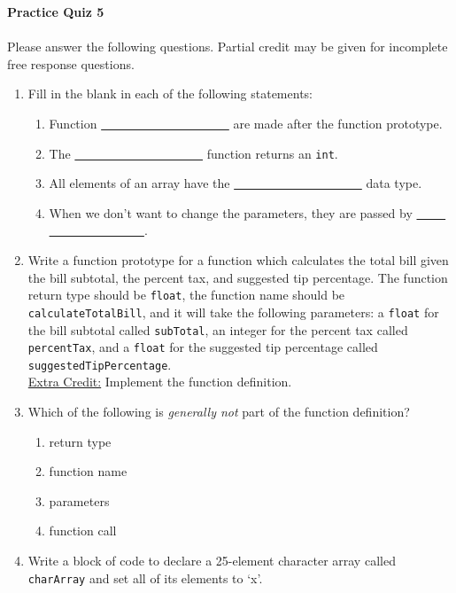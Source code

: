 \documentclass[letter,11pt]{article}
\begin{document}
\huge
\textbf{Practice Quiz 5}
\normalsize

\paragraph{}Please answer the following questions. Partial credit may be given for incomplete free response questions.

\begin{enumerate}
    \item Fill in the blank in each of the following statements:
    \begin{enumerate}
        \item Function \underline{~~ ~~ ~~ ~~ ~~ ~~ ~~ ~~} are made after the function prototype.
        \item The \underline{~~ ~~ ~~ ~~ ~~ ~~ ~~ ~~} function returns an \texttt{int}.
        \item All elements of an array have the \underline{~~ ~~ ~~ ~~ ~~ ~~ ~~ ~~} data type.
        \item When we don't want to change the parameters, they are passed by \underline{~~ ~~ ~~ ~~ ~~ ~~ ~~ ~~}.
    \end{enumerate}
    
    \item Write a function prototype for a function which calculates the total bill given the bill subtotal, the percent tax, and suggested tip percentage. The function return type should be \texttt{float}, the function name should be \texttt{calculateTotalBill}, and it will take the following parameters: a \texttt{float} for the bill subtotal called \texttt{subTotal}, an integer for the percent tax called \texttt{percentTax}, and a \texttt{float} for the suggested tip percentage called \texttt{suggestedTipPercentage}. \\
    \underline{Extra Credit:} Implement the function definition.
    
    \item Which of the following is \textit{generally not} part of the function definition?
    \begin{enumerate}
        \item return type
        \item function name
        \item parameters
        \item function call
    \end{enumerate}
    
    \item Write a block of code to declare a 25-element character array called \texttt{charArray} and set all of its elements to `x'.
    

\end{enumerate}
\end{document}
